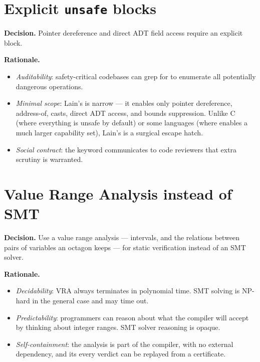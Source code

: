 \section{Explicit \texttt{unsafe} blocks}
\label{sec:rationale.unsafe}

\pnum
\textbf{Decision.}  Pointer dereference and direct ADT field access
require an explicit  block.

\pnum
\textbf{Rationale.}
\begin{itemize}
  \item \textit{Auditability}: safety-critical codebases can grep for
         to enumerate all potentially dangerous
        operations.
  \item \textit{Minimal scope}: Lain's  is narrow — it
        enables only pointer dereference, address-of, casts, direct ADT
        access, and bounds suppression.  Unlike C (where everything is
        unsafe by default) or some languages (where  enables
        a much larger capability set), Lain's  is a
        surgical escape hatch.
  \item \textit{Social contract}: the keyword communicates to code
        reviewers that extra scrutiny is warranted.
\end{itemize}

\section{Value Range Analysis instead of SMT}
\label{sec:rationale.vra}

\pnum
\textbf{Decision.}  Use a value range analysis --- intervals, and the relations between
pairs of variables an octagon keeps --- for static verification instead of an SMT solver.

\pnum
\textbf{Rationale.}
\begin{itemize}
  \item \textit{Decidability}: VRA always terminates in polynomial time.
        SMT solving is NP-hard in the general case and may time out.
  \item \textit{Predictability}: programmers can reason about what the
        compiler will accept by thinking about integer ranges.  SMT
        solver reasoning is opaque.
  \item \textit{Self-containment}: the analysis is part of the compiler, with no
        external dependency, and its every verdict can be replayed from a certificate.
\end{itemize}

